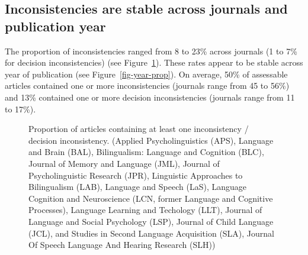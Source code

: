 \documentclass[
  doc,
  longtable,
  nolmodern,
  notxfonts,
  notimes,
  colorlinks=true,linkcolor=blue,citecolor=blue,urlcolor=blue]{apa7}
\begin{document}
\subsection{Inconsistencies are stable across journals and publication
year}\label{sec-stable}

The proportion of inconsistencies ranged from 8 to 23\% across journals
(1 to 7\% for decision inconsistencies) (see
Figure~\ref{fig-stacked-bar}). These rates appear to be stable across
year of publication (see Figure~\ref{fig-year-prop}). On average, 50\%
of assessable articles contained one or more inconsistencies (journals
range from 45 to 56\%) and 13\% contained one or more decision
inconsistencies (journals range from 11 to 17\%).

\begin{figure}[H]

\caption{\label{fig-stacked-bar}Proportion of articles containing at
least one inconsistency / decision inconsistency. (Applied
Psycholinguistics (APS), Language and Brain (BAL), Bilingualism:
Language and Cognition (BLC), Journal of Memory and Language (JML),
Journal of Psycholinguistic Research (JPR), Linguistic Approaches to
Bilingualism (LAB), Language and Speech (LaS), Language Cognition and
Neuroscience (LCN, former Language and Cognitive Processes), Language
Learning and Techology (LLT), Journal of Language and Social Psychology
(LSP), Journal of Child Language (JCL), and Studies in Second Language
Acquisition (SLA), Journal Of Speech Language And Hearing Research
(SLH))}


\end{figure}%
\end{document}
